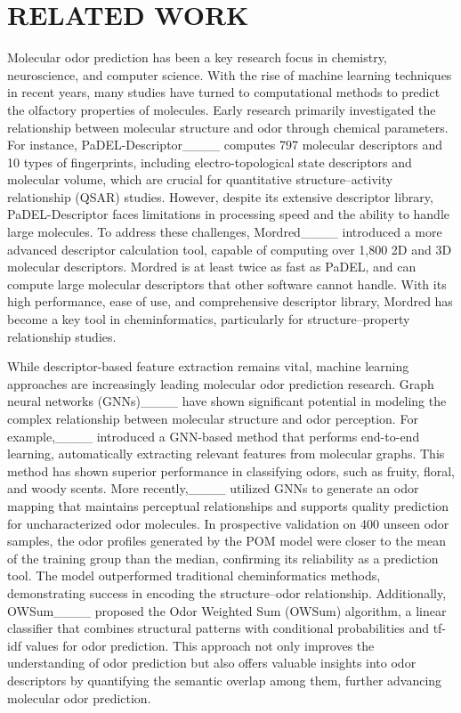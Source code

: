 \section{RELATED WORK}
Molecular odor prediction has been a key research focus in chemistry, neuroscience, and computer science. With the rise of machine learning techniques in recent years, many studies have turned to computational methods to predict the olfactory properties of molecules. Early research primarily investigated the relationship between molecular structure and odor through chemical parameters. For instance, PaDEL-Descriptor____ computes 797 molecular descriptors and 10 types of fingerprints, including electro-topological state descriptors and molecular volume, which are crucial for quantitative structure–activity relationship (QSAR) studies. However, despite its extensive descriptor library, PaDEL-Descriptor faces limitations in processing speed and the ability to handle large molecules. To address these challenges, Mordred____ introduced a more advanced descriptor calculation tool, capable of computing over 1,800 2D and 3D molecular descriptors. Mordred is at least twice as fast as PaDEL, and can compute large molecular descriptors that other software cannot handle. With its high performance, ease of use, and comprehensive descriptor library, Mordred has become a key tool in cheminformatics, particularly for structure–property relationship studies.

While descriptor-based feature extraction remains vital, machine learning approaches are increasingly leading molecular odor prediction research. Graph neural networks (GNNs)____ have shown significant potential in modeling the complex relationship between molecular structure and odor perception. For example,____ introduced a GNN-based method that performs end-to-end learning, automatically extracting relevant features from molecular graphs. This method has shown superior performance in classifying odors, such as fruity, floral, and woody scents. More recently,____ utilized GNNs to generate an odor mapping that maintains perceptual relationships and supports quality prediction for uncharacterized odor molecules. In prospective validation on 400 unseen odor samples, the odor profiles generated by the POM model were closer to the mean of the training group than the median, confirming its reliability as a prediction tool. The model outperformed traditional cheminformatics methods, demonstrating success in encoding the structure–odor relationship. Additionally, OWSum____ proposed the Odor Weighted Sum (OWSum) algorithm, a linear classifier that combines structural patterns with conditional probabilities and tf-idf values for odor prediction. This approach not only improves the understanding of odor prediction but also offers valuable insights into odor descriptors by quantifying the semantic overlap among them, further advancing molecular odor prediction.